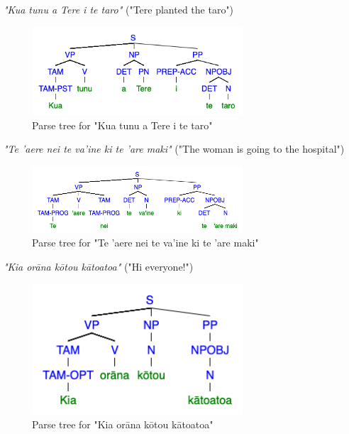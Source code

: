 \begin{enumarabic}
  \item \emph{"Kua tunu a Tere i te taro"} ("Tere planted the taro")
    
    \begin{figure}[H]
      \centering
      \includegraphics[width=0.7\textwidth]{figures/1.1.png}
      \caption{Parse tree for "Kua tunu a Tere i te taro"}
    \end{figure}

  \item \emph{"Te 'aere nei te va'ine ki te 'are maki"} ("The woman is going to the hospital")
      
    \begin{figure}[H]
      \centering
      \includegraphics[width=0.7\textwidth]{figures/1.2.png}
      \caption{Parse tree for "Te 'aere nei te va'ine ki te 'are maki"}
    \end{figure}

  \newpage
  \item \emph{"Kia orāna kōtou kātoatoa"} ("Hi everyone!")
        
    \begin{figure}[H]
      \centering
      \includegraphics[width=0.7\textwidth]{figures/1.3.png}
      \caption{Parse tree for "Kia orāna kōtou kātoatoa"}
    \end{figure}


\end{enumarabic}
